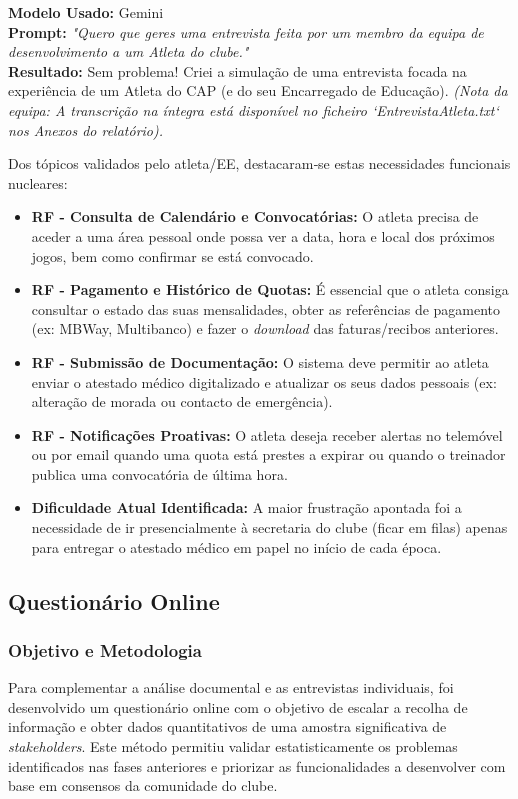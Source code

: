 \documentclass[a4paper,12pt]{scrreprt}
\newcommand{\caixaprompt}[3]{
    \begin{tcolorbox}[
        enhanced,
        colback=azulclaro,      %
        colframe=blue!50!black, %
        arc=2mm,                %
        boxrule=0.5mm,          %
        title=\textbf{Documentação de IA}, %
        fonttitle=\sffamily,
        coltitle=black,
        attach title to upper,
        after title={\par\medskip},
    ]
        \textbf{Modelo Usado:} #1 \\
        \textbf{Prompt:} \textit{"#2"} \\
        \tcbline %
        \textbf{Resultado:} #3
    \end{tcolorbox}
}
\begin{document}
{\caixaprompt{Gemini}{Quero que geres uma entrevista feita por um membro da equipa de desenvolvimento a um Atleta do clube.}{Sem problema! Criei a simulação de uma entrevista focada na experiência de um Atleta do CAP (e do seu Encarregado de Educação). \textit{(Nota da equipa: A transcrição na íntegra está disponível no ficheiro `EntrevistaAtleta.txt` nos Anexos do relatório).}}

Dos tópicos validados pelo atleta/EE, destacaram‑se estas necessidades funcionais nucleares:

\begin{itemize}
    \item \textbf{RF - Consulta de Calendário e Convocatórias:} O atleta precisa de aceder a uma área pessoal onde possa ver a data, hora e local dos próximos jogos, bem como confirmar se está convocado.
    \item \textbf{RF - Pagamento e Histórico de Quotas:} É essencial que o atleta consiga consultar o estado das suas mensalidades, obter as referências de pagamento (ex: MBWay, Multibanco) e fazer o \textit{download} das faturas/recibos anteriores.
    \item \textbf{RF - Submissão de Documentação:} O sistema deve permitir ao atleta enviar o atestado médico digitalizado e atualizar os seus dados pessoais (ex: alteração de morada ou contacto de emergência).
    \item \textbf{RF - Notificações Proativas:} O atleta deseja receber alertas no telemóvel ou por email quando uma quota está prestes a expirar ou quando o treinador publica uma convocatória de última hora.
    \item \textbf{Dificuldade Atual Identificada:} A maior frustração apontada foi a necessidade de ir presencialmente à secretaria do clube (ficar em filas) apenas para entregar o atestado médico em papel no início de cada época.
\end{itemize}

\subsection{Questionário Online}

\subsubsection{Objetivo e Metodologia}

Para complementar a análise documental e as entrevistas individuais, foi desenvolvido um questionário online com o objetivo de escalar a recolha de informação e obter dados quantitativos de uma amostra significativa de \textit{stakeholders}. Este método permitiu validar estatisticamente os problemas identificados nas fases anteriores e priorizar as funcionalidades a desenvolver com base em consensos da comunidade do clube.

}
\end{document}
